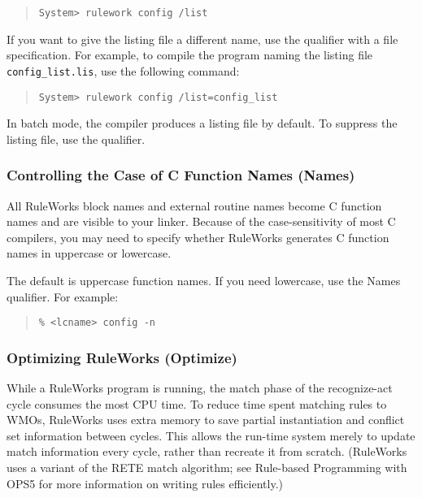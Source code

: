 \begin{quote}
\begin{verbatim}
System> rulework config /list
\end{verbatim}
\end{quote}  

If you want to give the listing file a different name, use the
 qualifier with a file specification. For example, to
compile the program  naming the listing file
\verb|config_list.lis|, use the following command:

\begin{quote}
\begin{verbatim}
System> rulework config /list=config_list
\end{verbatim}
\end{quote}  

In batch mode, the compiler produces a listing file by default. To
suppress the listing file, use the  qualifier.

\subsubsection{Controlling the Case of C Function Names (Names)}

All RuleWorks block names and external routine names become C function
names and are visible to your linker.  Because of the case-sensitivity
of most C compilers, you may need to specify whether RuleWorks
generates C function names in uppercase or lowercase.

The default is uppercase function names. If you need lowercase, use
the Names qualifier. For example:

\begin{quote}
\begin{verbatim}
% <lcname> config -n
\end{verbatim}
\end{quote}

\subsubsection{Optimizing RuleWorks (Optimize)}

While a RuleWorks program is running, the match phase of the
recognize-act cycle consumes the most CPU time. To reduce time spent
matching rules to WMOs, RuleWorks uses extra memory to save partial
instantiation and conflict set information between cycles. This allows
the run-time system merely to update match information every cycle,
rather than recreate it from scratch. (RuleWorks uses a variant of the
RETE match algorithm; see Rule-based Programming with OPS5 for more
information on writing rules efficiently.)

